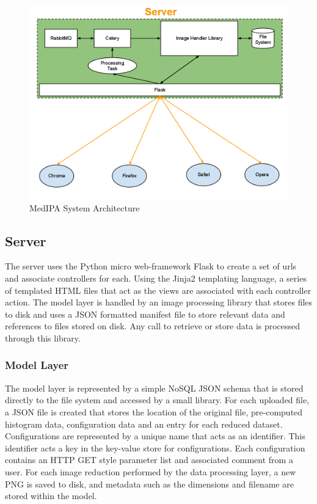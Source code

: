 \documentclass[annual]{acmsiggraph}
\begin{document}
\begin{figure}[htb]
	\includegraphics[scale=0.475]{architecture.png}
	\caption{\label{fig:head}MedIPA System Architecture}
\end{figure}

\subsection{Server}
	The server uses the Python micro web-framework Flask to create a set of urls and associate controllers for each.  Using the Jinja2 templating language, a series of templated HTML files that act as the views are associated with each controller action.  The model layer is handled by an image processing library that stores files to disk and uses a JSON formatted manifest file to store relevant data and references to files stored on disk.  Any call to retrieve or store data is processed through this library.

\subsubsection{Model Layer}
	The model layer is represented by a simple NoSQL JSON schema that is stored directly to the file system and accessed by a small library.  For each uploaded file, a JSON file is created that stores the location of the original file, pre-computed histogram data, configuration data and an entry for each reduced dataset.  Configurations are represented by a unique name that acts as an identifier.  This identifier acts a key in the key-value store for configurations.  Each configuration contains an HTTP GET style parameter list and associated comment from a user.  For each image reduction performed by the data processing layer, a new PNG is saved to disk, and metadata such as the dimensions and filename are stored within the model.
\end{document}
